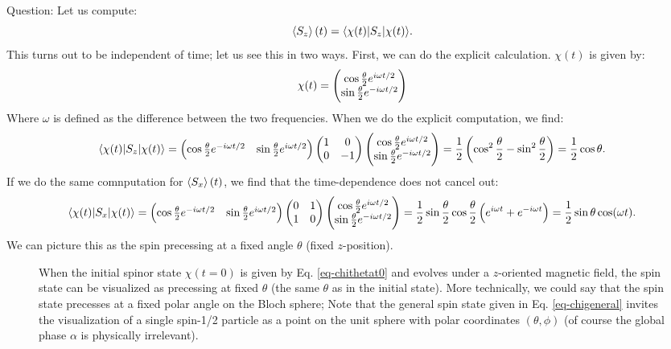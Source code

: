 Question: Let us compute:
\begin{equation}
    \left< S_z \right>(t) = \langle \chi(t) \rvert S_z\lvert \chi(t) \rangle.
\end{equation}
This turns out to be independent of time; let us see this in two ways. First, we can do the explicit calculation. $\chi(t)$ is given by:
\begin{equation}
    \chi(t) = \begin{pmatrix}\cos\frac{\theta}{2} e^{i\omega t/2} \\ \sin\frac{\theta}{2} e^{-i\omega t/2}\end{pmatrix}
\end{equation}
Where $\omega$ is defined as the difference between the two frequencies. When we do the explicit computation, we find:
\begin{equation}
    \langle \chi(t) \rvert S_z\lvert \chi(t) \rangle = \begin{pmatrix}\cos\frac{\theta}{2} e^{-i\omega t/2}& \sin\frac{\theta}{2} e^{i\omega t/2}\end{pmatrix}\begin{pmatrix} 1 & 0 \\ 0 & -1 \end{pmatrix} \begin{pmatrix}\cos\frac{\theta}{2} e^{i\omega t/2} \\ \sin\frac{\theta}{2} e^{-i\omega t/2}\end{pmatrix} =  \frac{1}{2}\left(\cos^2\frac{\theta}{2} - \sin^2\frac{\theta}{2}\right) = \frac{1}{2}\cos\theta.
\end{equation}
If we do the same comnputation for $\left< S_x \right>(t)$, we find that the time-dependence does not cancel out:
\begin{equation}
    \langle \chi(t) \rvert S_x\lvert \chi(t) \rangle = \begin{pmatrix}\cos\frac{\theta}{2} e^{-i\omega t/2}& \sin\frac{\theta}{2} e^{i\omega t/2}\end{pmatrix}\begin{pmatrix} 0 & 1 \\ 1 & 0 \end{pmatrix} \begin{pmatrix}\cos\frac{\theta}{2} e^{i\omega t/2} \\ \sin\frac{\theta}{2} e^{-i\omega t/2}\end{pmatrix} =  \frac{1}{2}\sin\frac{\theta}{2}\cos\frac{\theta}{2}\left(e^{i\omega t} + e^{-i\omega t}\right) = \frac{1}{2}\sin\theta\cos(\omega t).
\end{equation}
We can picture this as the spin precessing at a fixed angle $\theta$ (fixed $z$-position).

\begin{figure}[htbp]
    \centering
    \caption{When the initial spinor state $\chi(t = 0)$ is given by Eq. \eqref{eq-chithetat0} and evolves under a $z$-oriented magnetic field, the spin state can be visualized as precessing at fixed $\theta$ (the same $\theta$ as in the initial state). More technically, we could say that the spin state precesses at a fixed polar angle on the Bloch sphere; Note that the general spin state given in Eq. \eqref{eq-chigeneral} invites the visualization of a single spin-1/2 particle as a point on the unit sphere with polar coordinates $(\theta, \phi)$ (of course the global phase $\alpha$ is physically irrelevant).}
    \label{fig-spinprecess}
\end{figure}

